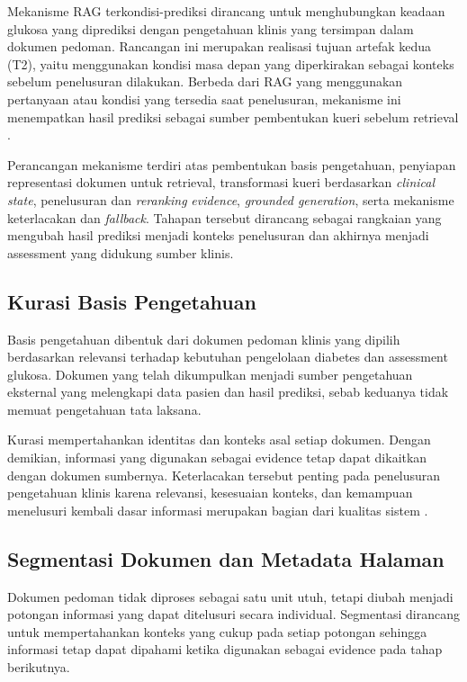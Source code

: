 Mekanisme RAG terkondisi-prediksi dirancang untuk menghubungkan keadaan glukosa yang diprediksi dengan pengetahuan klinis yang tersimpan dalam dokumen pedoman. Rancangan ini merupakan
realisasi tujuan artefak kedua (T2), yaitu menggunakan kondisi masa depan yang diperkirakan sebagai konteks sebelum penelusuran dilakukan. Berbeda dari RAG yang menggunakan pertanyaan
atau kondisi yang tersedia saat penelusuran, mekanisme ini menempatkan hasil prediksi sebagai sumber pembentukan kueri sebelum retrieval \parencite{lewis2020,gao2023}.

Perancangan mekanisme terdiri atas pembentukan basis pengetahuan, penyiapan representasi dokumen untuk retrieval, transformasi kueri berdasarkan \textit{clinical state},
penelusuran dan \textit{reranking} \textit{evidence}, \textit{grounded generation}, serta mekanisme keterlacakan dan \textit{fallback}. Tahapan tersebut dirancang sebagai rangkaian yang mengubah hasil
prediksi menjadi konteks penelusuran dan akhirnya menjadi assessment yang didukung sumber klinis.

\subsection{Kurasi Basis Pengetahuan} 
\label{subsec:bab4-kurasi-basis-pengetahuan}

Basis pengetahuan dibentuk dari dokumen pedoman klinis yang dipilih berdasarkan relevansi terhadap kebutuhan pengelolaan diabetes dan assessment glukosa. Dokumen yang telah dikumpulkan
menjadi sumber pengetahuan eksternal yang melengkapi data pasien dan hasil prediksi, sebab keduanya tidak memuat pengetahuan tata laksana.

Kurasi mempertahankan identitas dan konteks asal setiap dokumen. Dengan demikian, informasi yang digunakan sebagai evidence tetap dapat dikaitkan dengan dokumen sumbernya. Keterlacakan
tersebut penting pada penelusuran pengetahuan klinis karena relevansi, kesesuaian konteks, dan kemampuan menelusuri kembali dasar informasi merupakan bagian dari kualitas
sistem \parencite{amugongo2025}.

\subsection{Segmentasi Dokumen dan Metadata Halaman} 
\label{subsec:bab4-segmentasi-dokumen-metadata}

Dokumen pedoman tidak diproses sebagai satu unit utuh, tetapi diubah menjadi potongan informasi yang dapat ditelusuri secara individual. Segmentasi dirancang untuk mempertahankan
konteks yang cukup pada setiap potongan sehingga informasi tetap dapat dipahami ketika digunakan sebagai evidence pada tahap berikutnya.

